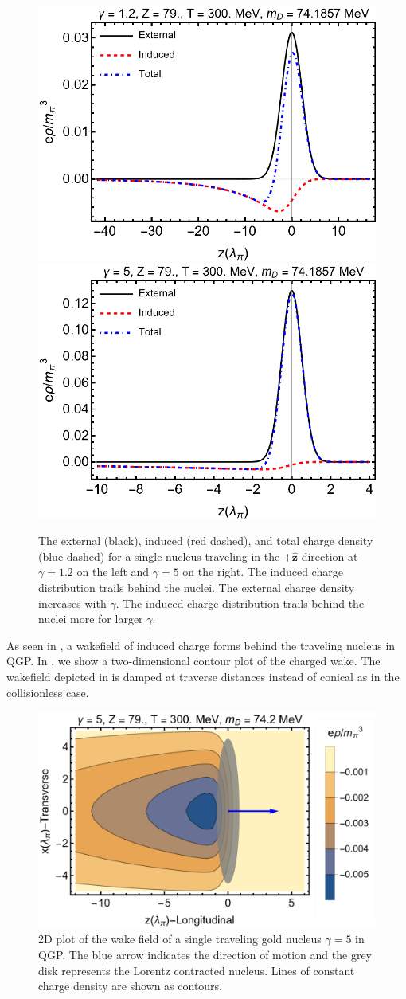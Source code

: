 \phantom{Phantom text}
\begin{figure}[ht]
\centering
\includegraphics[width=0.45\linewidth]{plots/chap02QCD/indchg12.png}
\hspace{0.05\linewidth}
\includegraphics[width=0.45\linewidth]{plots/chap02QCD/indchg5.png}
\caption{The external (black), induced (red dashed), and total charge density (blue dashed) for a single nucleus traveling in the $+\boldsymbol{\hat{z}}$ direction at $\gamma = 1.2$ on the left and $\gamma = 5$ on the right. The induced charge distribution trails behind the nuclei. The external charge density increases with $\gamma$. The induced charge distribution trails behind the nuclei more for larger $\gamma$. \label{fig:potcomp}}
\end{figure}

As seen in , a wakefield of induced charge forms behind the traveling nucleus in QGP. In , we show a two-dimensional contour plot of the charged wake. The wakefield depicted in  is damped at traverse distances instead of conical as in the collisionless case.
\begin{figure}[ht]
\centering
\includegraphics[width=0.85\linewidth]{plots/chap02QCD/chwake.png}
\caption{2D plot of the wake field of a single traveling gold nucleus $\gamma = 5$ in QGP. The blue arrow indicates the direction of motion and the grey disk represents the Lorentz contracted nucleus. Lines of constant charge density are shown as contours. \label{fig:chgwake}}
\end{figure}


